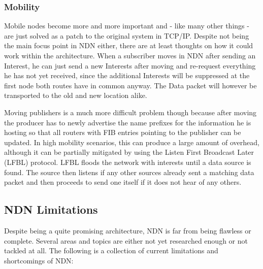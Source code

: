 \subsubsection{Mobility} \label{subsubsection:Mobility}
Mobile nodes become more and more important and - like many other things - are just solved as a patch to the original system in TCP/IP. Despite not being the main focus point in NDN either, there are at least thoughts on how it could work within the architecture. When a subscriber moves in NDN after sending an Interest, he can just send a new Interests after moving and re-request everything he has not yet received, since the additional Interests will be suppressed at the first node both routes have in common anyway. The Data packet will however be transported to the old and new location alike. 

Moving publishers is a much more difficult problem though because after moving the producer has to newly advertise the name prefixes for the information he is hosting so that all routers with FIB entries pointing to the publisher can be updated. In high mobility scenarios, this can produce a large amount of overhead, although it can be partially mitigated by using the Listen First Broadcast Later (LFBL) protocol. LFBL floods the network with interests until a data source is found. The source then listens if any other sources already sent a matching data packet and then proceeds to send one itself if it does not hear of any others. \cite{ZABJ14}
\subsection{NDN Limitations}


Despite being a quite promising architecture, NDN is far from being flawless or complete. Several areas and topics are either not yet researched enough or not tackled at all. The following is a collection of current limitations and shortcomings of NDN:

